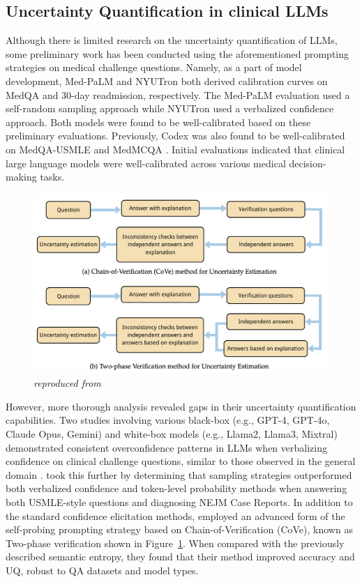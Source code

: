 \subsection{Uncertainty Quantification in clinical LLMs}
Although there is limited research on the uncertainty quantification of LLMs, some preliminary work has been conducted using the aforementioned prompting strategies on medical challenge questions. Namely, as a part of model development, Med-PaLM \citep{singhalLargeLanguageModels2023} and NYUTron \citep{jiangHealthSystemscaleLanguage2023} both derived calibration curves on MedQA and 30-day readmission, respectively. The Med-PaLM evaluation used a self-random sampling approach while NYUTron used a verbalized confidence approach. Both models were found to be well-calibrated based on these preliminary evaluations. Previously, Codex was also found to be well-calibrated on MedQA-USMLE and MedMCQA \citep{lievinCanLargeLanguage2024}. Initial evaluations indicated that clinical large language models were well-calibrated across various medical decision-making tasks. 

\begin{figure}[htbp]
	\centering
	\includegraphics[width=1\linewidth] {figures/cove.png}
	\caption{\emph{reproduced from \citet{wuUncertaintyEstimationLarge2024}}} \label{fig:CoVe}
\end{figure}

However, more thorough analysis revealed gaps in their uncertainty quantification capabilities. Two studies involving various black-box (e.g., GPT-4, GPT-4o, Claude Opus, Gemini) and white-box models (e.g., Llama2, Llama3, Mixtral) demonstrated consistent overconfidence patterns in LLMs when verbalizing confidence on clinical challenge questions, similar to those observed in the general domain \citet{omarBenchmarkingConfidenceLarge2024, savageLargeLanguageModel2024}. \citet{savageLargeLanguageModel2024} took this further by determining that sampling strategies outperformed both verbalized confidence and token-level probability methods when answering both USMLE-style questions and diagnosing NEJM Case Reports. In addition to the standard confidence elicitation methods, \citet{wuUncertaintyEstimationLarge2024} employed an advanced form of the self-probing prompting strategy based on Chain-of-Verification (CoVe), known as Two-phase verification shown in Figure~\ref{fig:CoVe}. When compared with the previously described semantic entropy, they found that their method improved accuracy and UQ, robust to QA datasets and model types. 

